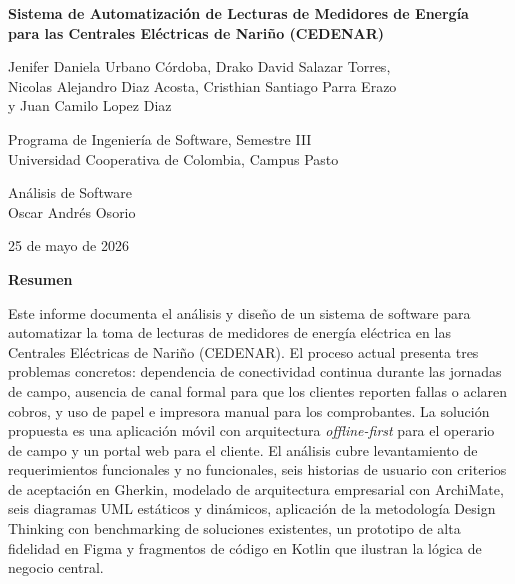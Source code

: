 \documentclass[12pt, a4paper]{article}
\begin{document}
\begin{titlepage}
  \centering
  \vspace*{3cm}

  {\large\bfseries
    Sistema de Automatización de Lecturas de Medidores de Energía\\
    para las Centrales Eléctricas de Nariño (CEDENAR)
  \par}

  \vspace{1.5cm}

  {\normalsize
    Jenifer Daniela Urbano Córdoba, Drako David Salazar Torres,\\
    Nicolas Alejandro Diaz Acosta, Cristhian Santiago Parra Erazo\\
    y Juan Camilo Lopez Diaz
  \par}

  \vspace{1cm}

  {\normalsize
    Programa de Ingeniería de Software, Semestre III\\
    Universidad Cooperativa de Colombia, Campus Pasto
  \par}

  \vspace{1cm}

  {\normalsize
    Análisis de Software\\
    Oscar Andrés Osorio
  \par}

  \vspace{1cm}

  {\normalsize 25 de mayo de 2026\par}

\end{titlepage}

\newpage
\begin{center}
  \textbf{Resumen}
\end{center}

\noindent Este informe documenta el análisis y diseño de un sistema de software para automatizar la toma de lecturas de medidores de energía eléctrica en las Centrales Eléctricas de Nariño (CEDENAR). El proceso actual presenta tres problemas concretos: dependencia de conectividad continua durante las jornadas de campo, ausencia de canal formal para que los clientes reporten fallas o aclaren cobros, y uso de papel e impresora manual para los comprobantes. La solución propuesta es una aplicación móvil con arquitectura \textit{offline-first} para el operario de campo y un portal web para el cliente. El análisis cubre levantamiento de requerimientos funcionales y no funcionales, seis historias de usuario con criterios de aceptación en Gherkin, modelado de arquitectura empresarial con ArchiMate, seis diagramas UML estáticos y dinámicos, aplicación de la metodología Design Thinking con benchmarking de soluciones existentes, un prototipo de alta fidelidad en Figma y fragmentos de código en Kotlin que ilustran la lógica de negocio central.
\end{document}
